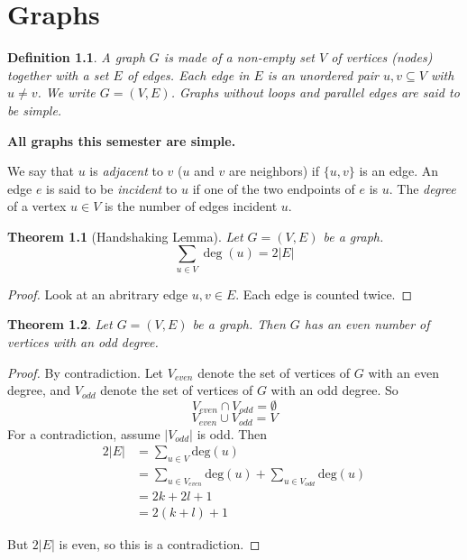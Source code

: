 \documentclass[openany]{report}
\newtheorem{theorem}{Theorem}[section]
\newtheorem{definition}{Definition}[section]
\begin{document}
\chapter{Graphs}
\begin{definition}
    A \emph{graph} $G$ is made of a non-empty set $V$ of \emph{vertices} (nodes)
    together with a set $E$ of \emph{edges}. Each edge in $E$ is an unordered pair ${u, v} \subseteq V$ with $u \neq v$. We write $G = (V,E)$. Graphs without loops and parallel edges are said to be \emph{simple}. 
\end{definition}

\begin{center}
    \textbf{ All graphs this semester are simple.}
\end{center}
We say that $u$ is \emph{adjacent} to $v$ ($u$ and $v$ are neighbors) if $\{u,v\}$ is an edge. An edge $e$ is said to be \emph{incident} to $u$ if one of the two endpoints of $e$ is $u$. The \emph{degree} of a vertex $u \in V$ is the number of edges incident $u$.
\begin{theorem}[Handshaking Lemma]
    Let $G = (V,E)$ be a graph. 
    \[\sum_{u \in V} \deg(u) = 2|E|\]
\end{theorem} 
\begin{proof}
    Look at an abritrary edge ${u,v} \in E$. Each edge is counted twice.
\end{proof}
\begin{theorem}
    Let $G = (V,E)$ be a graph. Then $G$ has an even number of vertices with an odd degree.
\end{theorem}
\begin{proof}
    By contradiction. Let $V_{even}$ denote the set of vertices of $G$ with an even degree, and $V_{odd}$ denote the set of vertices of $G$ with an odd degree. So 
    \[V_{even} \cap V_{odd} = \emptyset\]
    \[V_{even} \cup V_{odd} = V\]
    For a contradiction, assume $|V_{odd}|$ is odd. Then
    \begin{align*}
        2|E| &= \sum_{u \in V} \text{deg}(u)\tag{Handshaking Lemma}\\
        &= \sum_{u \in V_{even}}\text{deg}(u) + \sum_{u \in V_{odd}}\text{deg}(u)\\
        &= 2k + 2l+1\\
        &= 2(k+l)+1
    \end{align*}

    But $2|E|$ is even, so this is a contradiction.
    
\end{proof}
\end{document}
